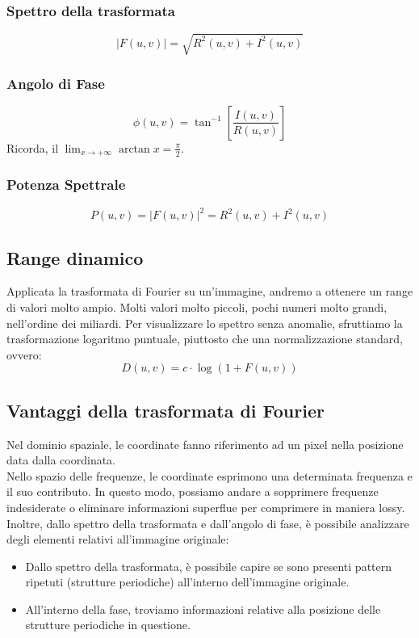 \documentclass{report}
\begin{document}
	\subsubsection{Spettro della trasformata}
	$$
	|F(u,v)| = \sqrt{R^2(u,v)+I^2(u,v)}
	$$
	\subsubsection{Angolo di Fase}
	$$
	\phi(u,v) = \tan^{-1}\left[\frac{I(u,v)}{R(u,v)}\right]
	$$
	Ricorda, il $\lim_{x \to +\infty} \arctan{x}= \frac{\pi}{2}$.
	\subsubsection{Potenza Spettrale}
	$$
	P(u,v) = |F(u,v)|^2 = R^2(u,v) + I^2(u,v)
	$$
		
		
	\subsection{Range dinamico}
	Applicata la trasformata di Fourier su un'immagine, andremo a ottenere un range di valori molto ampio. Molti valori molto piccoli, pochi numeri molto grandi, nell'ordine dei miliardi. Per visualizzare lo spettro senza anomalie, sfruttiamo la trasformazione logaritmo puntuale, piuttosto che una normalizzazione standard, ovvero:
	$$
	D(u,v) = c\cdot\log(1+F(u,v))
	$$
	\subsection{Vantaggi della trasformata di Fourier}
	Nel dominio spaziale, le coordinate fanno riferimento ad un pixel nella posizione data dalla coordinata.\\
	Nello spazio delle frequenze, le coordinate esprimono una determinata frequenza e il suo contributo.
	In questo modo, possiamo andare a sopprimere frequenze indesiderate o eliminare informazioni superflue per comprimere in maniera lossy.
	Inoltre, dallo spettro della trasformata e dall'angolo di fase, è possibile analizzare degli elementi relativi all'immagine originale:
	\begin{itemize}
		\item Dallo spettro della trasformata, è possibile capire se sono presenti pattern ripetuti (strutture periodiche) all'interno dell'immagine originale.
		\item All'interno della fase, troviamo informazioni relative alla posizione delle strutture periodiche in questione.
	\end{itemize}
\end{document}
